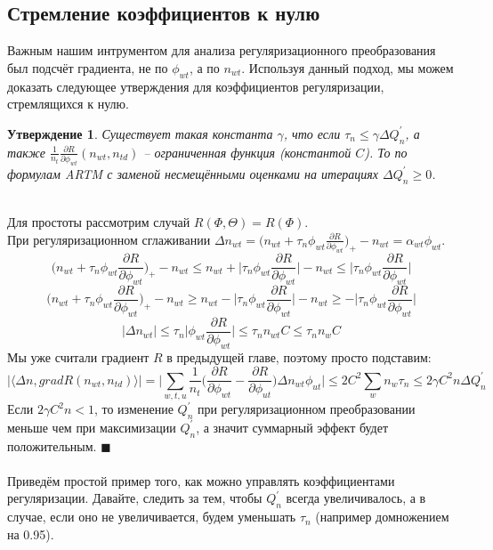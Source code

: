 \documentclass[12pt]{article}
\newtheorem{claim}[remark]{Утверждение}
\newenvironment{Proof} 
	{\par\noindent{\bf Доказательство.}} 
	{\hfill$\blacksquare$}
\renewcommand{\leq}{\leqslant}
\renewcommand{\geq}{\geqslant}
\begin{document}
           \subsection{Стремление коэффициентов к нулю}
Важным нашим интрументом для анализа регуляризационного преобразования был подсчёт градиента, не по $\phi_{wt}$, а по $n_{wt}$. Используя данный подход, мы можем доказать следующее утверждения для коэффициентов регуляризации, стремлящихся к нулю.\\
\begin{claim}
Существует такая константа $\gamma$, что если $\tau_n \leq \gamma \Delta Q^{\prime}_n$, а также $\frac{1}{n_t} \frac{\partial{R}}{\partial{\phi_{wt}}}(n_{wt}, n_{td})$ -- ограниченная функция (константой $C$). То по формулам ARTM с заменой несмещёнными оценками на итерациях $\Delta Q^{\prime}_n \geq 0$.
\end{claim}
\begin{Proof}
\ \\
Для простоты рассмотрим случай $R(\Phi, \Theta) = R(\Phi)$. \\
При регуляризационном сглаживании  $\Delta n_{wt} = \bigg( n_{wt} + \tau_n \phi_{wt} \frac{\partial{R}}{\partial{\phi_{wt}}}\bigg)_{+} - n_{wt} = \alpha_{wt} \phi_{wt}$.\\
\[
\bigg( n_{wt} + \tau_n \phi_{wt} \frac{\partial{R}}{\partial{\phi_{wt}}}\bigg)_{+} - n_{wt} \leq  n_{wt} +\bigg| \tau_n \phi_{wt} \frac{\partial{R}}{\partial{\phi_{wt}}}\bigg| - n_{wt} \leq \bigg| \tau_n \phi_{wt} \frac{\partial{R}}{\partial{\phi_{wt}}}\bigg|
\]
\[
\bigg( n_{wt} + \tau_n \phi_{wt} \frac{\partial{R}}{\partial{\phi_{wt}}}\bigg)_{+} - n_{wt} \geq  n_{wt} - \bigg| \tau_n \phi_{wt} \frac{\partial{R}}{\partial{\phi_{wt}}}\bigg| - n_{wt} \geq - \bigg| \tau_n \phi_{wt} \frac{\partial{R}}{\partial{\phi_{wt}}}\bigg|
\]
\[
|\Delta n_{wt} | \leq \tau_n\bigg|  \phi_{wt} \frac{\partial{R}}{\partial{\phi_{wt}}}\bigg| \leq \tau_n n_{wt} C \leq \tau_n n_{w} C
\]
Мы уже считали градиент $R$ в предыдущей главе, поэтому просто подставим:
\[
 \bigg|\langle\Delta n, grad R(n_{wt}, n_{td}) \rangle\bigg| = \bigg| \sum\limits_{w, t, u}  \frac{1}{n_{t}}  \bigg(  \frac{\partial{R}}{\partial{\phi_{wt}}}  -  \frac{\partial{R}}{\partial{\phi_{ut}}}  \bigg)  \Delta n_{wt}  \phi_{ut} \bigg| \leq 2C^2\sum_w n_w  \tau_n \leq 2 \gamma C^2n \Delta Q^{\prime}_n
\]
Если $ 2 \gamma C^2n < 1$, то изменение $Q^{\prime}_n$ при регуляризационном преобразовании меньше чем при максимизации $Q^{\prime}_n$, а значит суммарный эффект будет положительным.
\end{Proof}\ \\
\ \\
Приведём простой пример того, как можно управлять коэффициентами регуляризации. Давайте, следить за тем, чтобы $Q^{\prime}_n$ всегда увеличивалось, а в случае, если оно не увеличивается, будем уменьшать $\tau_n$ (например домножением на 0.95).
\end{document}
